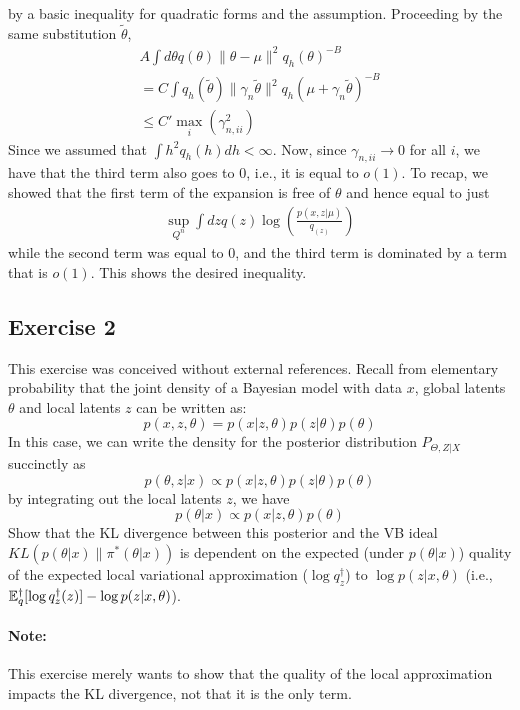 by a basic inequality for quadratic forms and the assumption. Proceeding by the same substitution $\tilde{\theta}$, 
\begin{gather*}
A \int d\theta q(\theta) \|\theta - \mu\|^2 q_h(\theta)^{-B} \\
= C \int q_h(\tilde{\theta}) \|\gamma_n \tilde{\theta} \|^2 q_h(\mu + \gamma_n\tilde{\theta})^{-B} \\
\leq C' \max_{i} (\gamma^2_{n, ii})
\end{gather*}
Since we assumed that $\int h^2 q_h(h)dh < \infty$. Now, since $\gamma_{n, ii} \to 0$ for all $i$, we have that the third term also goes to $0$, i.e., it is equal to $o(1)$. To recap, we showed that the first term of the expansion is free of $\theta$ and hence equal to just
\begin{gather*}
\sup_{Q^n} \int dz q(z) \log\left( \frac{p(x,z|\mu)}{q_(z)} \right) 
\end{gather*}
while the second term was equal to 0, and the third term is dominated by a term that is $o(1)$. This shows the desired inequality. 

\subsection{Exercise 2}

This exercise was conceived without external references. Recall from elementary probability that the joint density of a Bayesian model with data $x$, global latents $\theta$ and local latents $z$ can be written as:
$$
p(x,z,\theta) = p(x|z, \theta) p(z|\theta)p(\theta)
$$
%
In this case, we can write the density for the posterior distribution $P_{\Theta, Z|X}$ succinctly as 
$$
p(\theta, z|x) \propto p(x|z, \theta) p(z|\theta)p(\theta)
$$
%
by integrating out the local latents $z$, we have 
$$
p(\theta|x) \propto p(x|z, \theta) p(\theta)
$$
%
Show that the KL divergence between this posterior and the VB ideal $KL(p(\theta|x) \| \pi^*(\theta|x))$ is dependent on the expected (under $p(\theta|x)$) quality of the expected local variational approximation ($\log q_z^{\dagger}$) to $\log p(z|x,\theta)$ (i.e., $\mathbb{E}_q^{\dagger}[\log q_z^{\dagger}(z)] - \log p(z|x,\theta)$). 

\paragraph{Note:} This exercise merely wants to show that the quality of the local approximation impacts the KL divergence, not that it is the only term.

